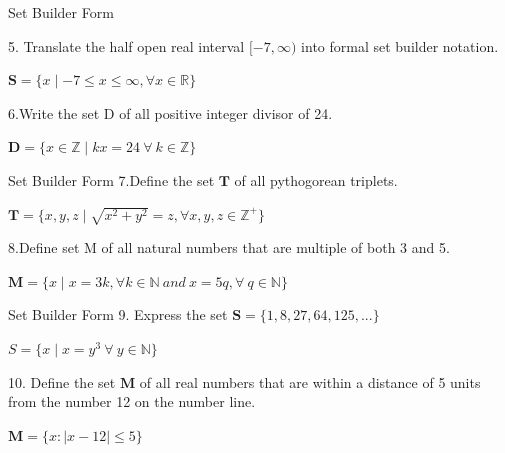 \documentclass{beamer}
\begin{document}
\begin{frame}{Set Builder Form}

    5. Translate the half open real interval $[-7,\infty)$ into formal set builder notation.\\
  \begin{center}
  $ \mathbf{S} = \{ x \mid -7 \leq x \le \infty, \forall x \in \mathbb{R} \}$ 
 \end{center}
  \vspace{1 em}
  6.Write the set D of all positive integer divisor of 24.\\
 \begin{center}
    
$ \mathbf{D} = \{ x \in\mathbb{Z}\mid kx=24\ \forall\ k \in \mathbb{Z}\}$\\
 \end{center}
\end{frame}

\begin{frame}{Set Builder Form}
    7.Define the set $\mathbf{T}$ of all pythogorean triplets.\\
    \begin{center}
        $\mathbf{T}=\{x,y,z\mid\sqrt{x^2+y^2}=z,\forall x,y,z\in \mathbb{Z^+}\} $
    \end{center}
    8.Define set M of all natural numbers that are multiple of both 3 and 5.
    \begin{center}
        $\mathbf{M}=\{x\mid x=3k,\forall k \in \mathbb{N}\ and\ x=5q,\forall \ q\in \mathbb{N}\}$
    \end{center}    
\end{frame}

\begin{frame}{Set Builder Form}
9. Express the set $\mathbf{S}=\{1,8,27,64,125,...\}$\\
\begin{center}
    $S=\{x\mid x=y^3\ \forall \ y \in \mathbb{N}\}$ 
\end{center}
\vspace{1 em}
10. Define the set $\mathbf{M}$ of all real numbers that are within a distance of 5 units from the number 12 on the number line.
\begin{center}
    $\mathbf{M}=\{x: | x-12 | \leq5\}$
\end{center}
    
\end{frame}
\end{document}
